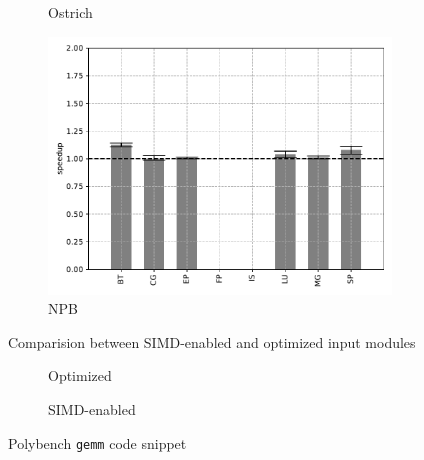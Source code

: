 \begin{figure}
\begin{subfigure}[t]{.45\textwidth}
        \caption{Ostrich}
    \end{subfigure}
    \begin{subfigure}[t]{.45\textwidth}
        \includegraphics[width=\textwidth]{Images/6.3.RQ3/npb-simd-speedup}
        \caption{NPB}
    \end{subfigure}
    \caption{Comparision between SIMD-enabled and optimized input modules}
    \label{fig:rq3}
\end{figure}

\begin{figure}
    \centering
    \begin{subfigure}{\textwidth}
        
        \caption{Optimized}
        \label{fig:polybench-gemm-opt-code}
    \end{subfigure}
    \begin{subfigure}{\textwidth}
        
        \caption{SIMD-enabled}
        \label{fig:polybench-gemm-simd-code}
    \end{subfigure}
    \caption{Polybench \texttt{gemm} code snippet}
\end{figure}

